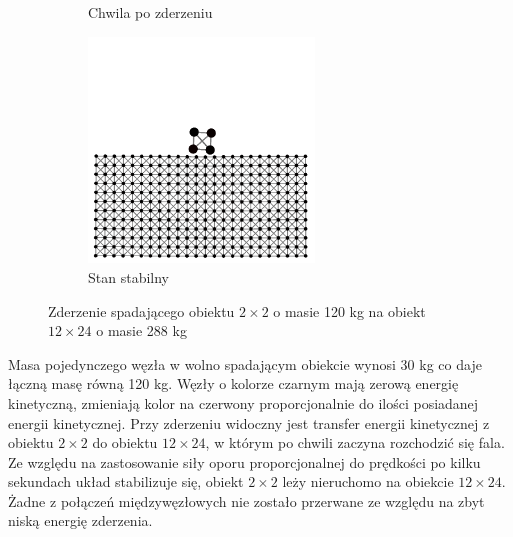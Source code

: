\documentclass[12pt, letterpaper]{report}
\begin{document}
\begin{figure}[h]
\begin{subfigure}{0.5\textwidth}
            \caption{Chwila po zderzeniu}
        \end{subfigure}
        \begin{subfigure}{0.5\textwidth}
            \centering
            \includegraphics[width=6cm, height=6cm]{collision_2x2_24x12_mass30_4}
            \caption{Stan stabilny}
        \end{subfigure}
        
        \caption{Zderzenie spadającego obiektu $2 \times 2$ o masie 120 kg na obiekt $12 \times 24$ o masie 288 kg}
    \end{figure}
    Masa pojedynczego węzła w wolno spadającym obiekcie wynosi 30 kg co daje łączną masę równą 120 kg.
    Węzły o kolorze czarnym mają zerową energię kinetyczną, 
    zmieniają kolor na czerwony proporcjonalnie do ilości posiadanej energii kinetycznej. 
    Przy zderzeniu widoczny jest transfer energii kinetycznej z obiektu $2 \times 2$ do obiektu $12 \times 24$, 
    w którym po chwili zaczyna rozchodzić się fala. Ze względu na zastosowanie siły oporu proporcjonalnej do prędkości
    po kilku sekundach układ stabilizuje się, obiekt $2 \times 2$ leży nieruchomo na obiekcie $12 \times 24$. 
    Żadne z połączeń międzywęzłowych nie zostało przerwane ze względu na zbyt niską energię zderzenia.

    \newpage
\end{document}
